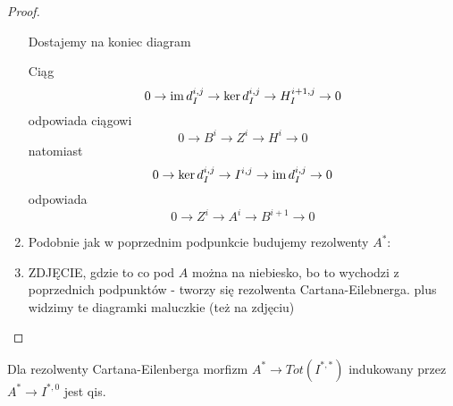 \begin{proof}
\begin{enumerate}
\begin{center}
\end{center}
      Dostajemy na koniec diagram 
      \begin{center}\end{center}
    Ciąg 
      $$0\to\operatorname{im} d_I^{i,j}\to \ker d_I^{i,j}\to H_I^{i+1,j}\to 0$$ 
      odpowiada ciągowi 
      $$0\to B^i\to Z^i\to H^i\to 0$$
      natomiast 
      $$0\to \ker d_I^{i,j}\to I^{i,j}\to \operatorname{im} d_I^{i,j}\to 0$$
      odpowiada
      $$0\to Z^i\to A^i\to B^{i+1}\to 0$$
    \item Podobnie jak w poprzednim podpunkcie budujemy rezolwenty $A^*$:
      \begin{center}\end{center}
    \item {\large\color{red}ZDJĘCIE}, gdzie to co pod $A$ można na niebiesko, bo to wychodzi z poprzednich podpunktów - tworzy się rezolwenta Cartana-Eilebnerga. plus widzimy te diagramki maluczkie (też na zdjęciu)
  \end{enumerate}
\end{proof}

\begin{fact}
  Dla rezolwenty Cartana-Eilenberga morfizm $A^*\to Tot(I^{*,*})$ indukowany przez $A^*\to I^{*,0}$ jest qis. 
\end{fact}

